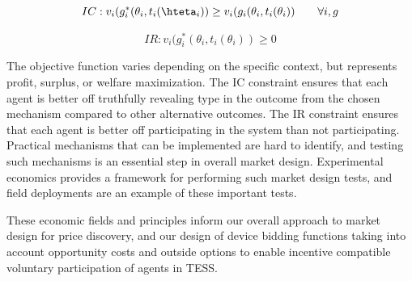 \begin{equation}
IC: 	v_i(g^*_i(\theta_i,t_i(\hteta_i)) \geq v_i(g_i(\theta_i,t_i(\theta_i)) \qquad \forall i,g
\end{equation}

\begin{equation}
IR:	    v_i(g^*_i(\theta_i,t_i(\theta_i)) \geq 0
\end{equation}

The objective function varies depending on the specific context, but represents profit, surplus, or welfare maximization. The IC constraint ensures that each agent is better off truthfully revealing type in the outcome from the chosen mechanism compared to other alternative outcomes. The IR constraint ensures that each agent is better off participating in the system than not participating. 
Practical mechanisms that can be implemented are hard to identify, and testing such mechanisms is an essential step in overall market design. Experimental economics provides a framework for performing such market design tests, and field deployments are an example of these important tests.

These economic fields and principles inform our overall approach to market design for price discovery, and our design of device bidding functions taking into account opportunity costs and outside options to enable incentive compatible voluntary participation of agents in TESS.

